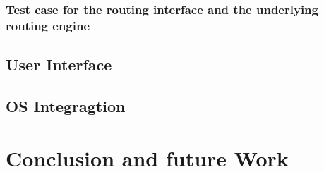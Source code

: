\documentclass[11pt,a4paper]{scrreprt}
\begin{document}
\subsection{Test case for the routing interface and the underlying routing engine}
\label{sub:routing_testcase}


\section{User Interface} %
\label{sec:user_interface}


\section{OS Integragtion} %
\label{sec:android_integration}


\chapter{Conclusion and future Work} %
\label{chp:platform_choice}


%
%
\end{document}
